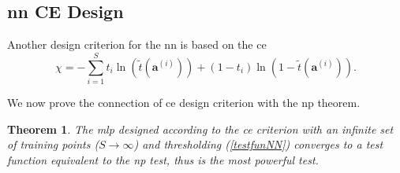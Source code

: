 \documentclass[draftcls,onecolumn,12pt]{IEEEtran}
\newcommand{\ai}{\bm{a}^{(i)}}
\newtheorem{theorem}{Theorem}
\begin{document}
\subsection{\ac{nn} CE Design}
\label{sec: ce_train}

Another design criterion for the \ac{nn} is based on the  \ac{ce} \cite{goodfellow}
\begin{equation}\label{eq:ce}
\chi = -\sum_{i=1}^{S} t_i\ln(\tilde{t}(\ai))+(1-t_i)\ln( 1-\tilde{t}(\ai)).
\end{equation}

We now prove the connection of \ac{ce} design criterion with the \ac{np} theorem.
\begin{theorem}
\label{th:nn_np2}
The \ac{mlp}  designed according to the  \ac{ce} criterion with an infinite set of training points ($S \rightarrow \infty$) and thresholding (\ref{testfunNN}) converges to a test function equivalent to the \ac{np} test, thus is the most powerful test.
\end{theorem}
\end{document}
